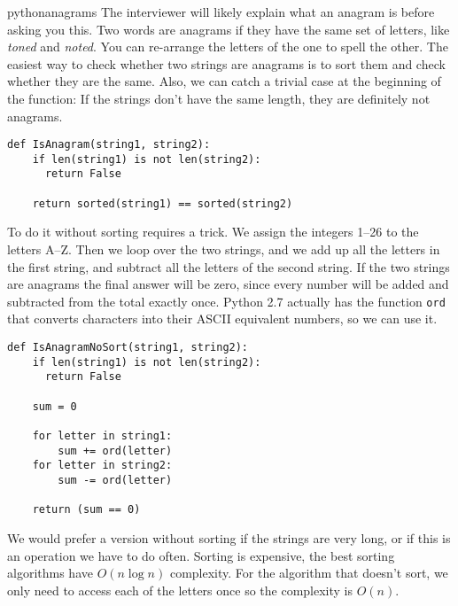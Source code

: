 \begin{answer}{pythonanagrams}
The interviewer will likely explain what an anagram is before asking you this.
Two words are anagrams if they have the same set of letters, like \emph{toned} and \emph{noted}.
You can re-arrange the letters of the one to spell the other.
The easiest way to check whether two strings are anagrams is to sort them and check whether they are the same.
Also, we can catch a trivial case at the beginning of the function: If the strings don't have the same length, they are definitely not anagrams.
\begin{verbatim}
def IsAnagram(string1, string2):
    if len(string1) is not len(string2):
      return False

    return sorted(string1) == sorted(string2)
\end{verbatim}
%
To do it without sorting requires a trick.
We assign
the integers 1--26
to
the letters A--Z.
Then we loop over the two strings, and we add up all the letters in the first string, and subtract all the letters of the second string.
If the two strings are anagrams the final answer will be zero, since every number will be added and subtracted from the total exactly once.
Python 2.7 actually has the function \verb+ord+ that converts characters into their ASCII equivalent numbers, so we can use it.
\begin{verbatim}
def IsAnagramNoSort(string1, string2):
    if len(string1) is not len(string2):
      return False

    sum = 0

    for letter in string1:
        sum += ord(letter)
    for letter in string2:
        sum -= ord(letter)

    return (sum == 0)
\end{verbatim}
We would prefer a version without sorting if the strings are very long, or if this is an operation we have to do often.
Sorting is expensive, the best sorting algorithms have $O(n\log{n})$ complexity.
For the algorithm that doesn't sort, we only need to access each of the letters once so the complexity is $O(n)$.
\end{answer}
